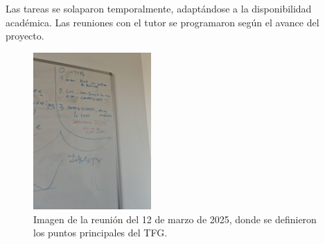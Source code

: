 \documentclass[a4paper, 12pt]{book}
\begin{document}
Las tareas se solaparon temporalmente, adaptándose a la disponibilidad académica. Las reuniones con el tutor se programaron según el avance del proyecto.

\begin{figure}[H]
    \centering
    \includegraphics[width=0.4\textwidth]{img/reunion_2025-03-12.png}
    \caption{Imagen de la reunión del 12 de marzo de 2025, donde se definieron los puntos principales del TFG.}
    \label{fig:reunion-marzo}
\end{figure}

\newpage
\end{document}
